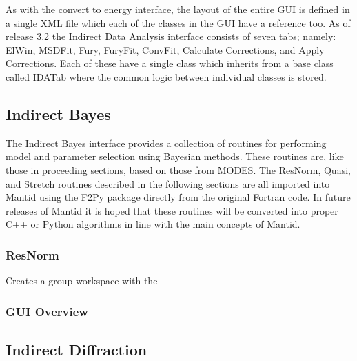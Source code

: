 \documentclass[paper=a4, fontsize=11pt]{scrartcl}	%
\numberwithin{equation}{section}															%
\numberwithin{figure}{section}																%
\numberwithin{table}{section}																%
\begin{document}
As with the convert to energy interface, the layout of the entire GUI is defined in a single XML file which each of the classes in the GUI have a reference too. As of release 3.2 the Indirect Data Analysis interface consists of seven tabs; namely: ElWin, MSDFit, Fury, FuryFit, ConvFit, Calculate Corrections, and Apply Corrections. Each of these have a single class which inherits from a base class called IDATab where the common logic between individual classes is stored. 

\subsection{Indirect Bayes}
The Indirect Bayes interface provides a collection of routines for performing model and parameter selection using Bayesian methods. These routines are, like those in proceeding sections, based on those from MODES. The ResNorm, Quasi, and Stretch routines described in the following sections are all imported into Mantid using the F2Py package directly from the original Fortran code. In future releases of Mantid it is hoped that these routines will be converted into proper C++ or Python algorithms in line with the main concepts of Mantid.

\subsubsection{ResNorm}
Creates a group workspace with the

\subsubsection{GUI Overview}
\label{subsubsec:Bayes-GUI-Overview}
%
\subsection{Indirect Diffraction}
\label{subsec:indirect-diffraction}
%
%
%
\end{document}
